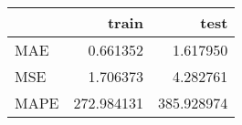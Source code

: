 \begin{tabular}{lrr}
\toprule
{} &       train &        test \\
\midrule
MAE  &    0.661352 &    1.617950 \\
MSE  &    1.706373 &    4.282761 \\
MAPE &  272.984131 &  385.928974 \\
\bottomrule
\end{tabular}
